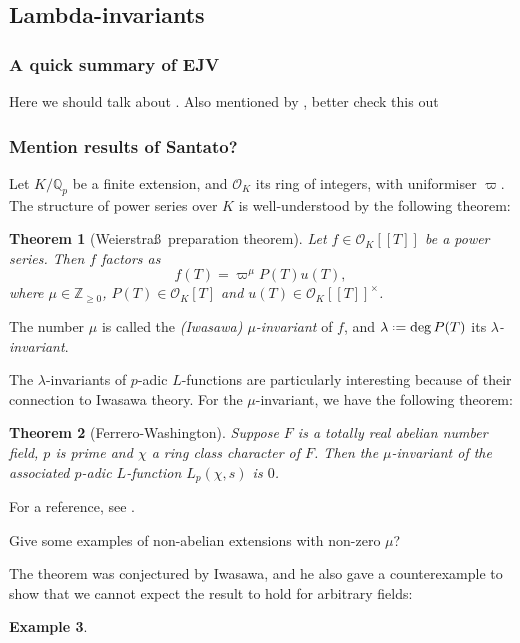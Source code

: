 \documentclass[11pt,a4paper]{article}
\newcommand{\Z}{\mathbb{Z}}
\newcommand{\Q}{\mathbb{Q}}
\renewcommand{\O}{\mathscr{O}}
\newcommand{\ps}[1]{[\![#1]\! ]}
\newcommand*{\defeq}{\mathrel{\vcenter{\baselineskip0.5ex \lineskiplimit0pt
      \hbox{\scriptsize.}\hbox{\scriptsize.}}}%
  =}
\theoremstyle{plain}
\newtheorem{thm}{Theorem}[section]
\theoremstyle{definition}
\newtheorem{eg}[thm]{Example}
\theoremstyle{remark}
\numberwithin{equation}{section}
\begin{document}
\subsection{Lambda-invariants}
\label{sec:lambda-invariants}

\subsubsection{A quick summary of EJV}
\label{sec:quick-summary-ejv}
Here we should talk about \cite{ellenberg2011}. Also mentioned by
\cite{roblot2013}, better check this out

\subsubsection{Mention results of Santato?}
\label{sec:ment-results-sant}



Let $K / \Q_{p}$ be a finite extension, and $\O_{K}$ its ring of
integers, with uniformiser $\varpi$. The structure of power series
over $K$ is well-understood by the following theorem:

\begin{thm}[Weierstra\ss\ preparation theorem]
  Let $f \in \O_{K}\ps{T}$ be a power series. 
  Then $f$ factors as 
  \begin{equation}
    \label{eq:14}
    f(T)= \varpi^{\mu} P(T)u(T),
  \end{equation}
  where $\mu \in \Z_{\geq 0}$, $P(T) \in \O_{K}[T]$ and $u(T) \in \O_{K}\ps{T}^{\times}$.
\end{thm}
The number $\mu$ is called the \emph{(Iwasawa) $\mu$-invariant} of $f$,
and $\lambda \defeq \deg P(T)$ its \emph{$\lambda$-invariant}.

The $\lambda$-invariants of $p$-adic $L$-functions are particularly
interesting because of their connection to Iwasawa theory. For the
$\mu$-invariant, we have the following theorem:
\begin{thm}[Ferrero-Washington]
Suppose $F$ is a totally real abelian number field, $p$ is prime and $\chi$ a ring
class character of $F$. Then the $\mu$-invariant of the associated
$p$-adic $L$-function $L_{p}(\chi,s)$ is $0$. 
\end{thm}
For a reference, see \cite[\S10]{lang1990}. 

{\color{red} Give some examples of non-abelian extensions with
  non-zero $\mu$?}

The theorem was conjectured by Iwasawa, and he also gave a
counterexample to show that we cannot expect the result to hold for
arbitrary fields:
\begin{eg}
  
\end{eg}
\end{document}
